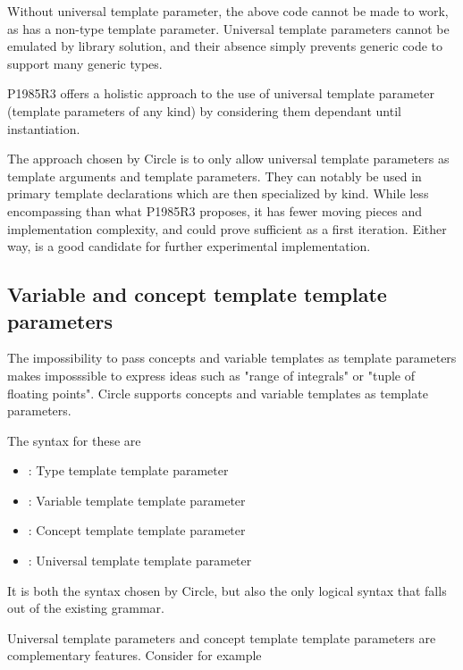 \documentclass{wg21}
\begin{document}
Without universal template parameter, the above code cannot be made to work,
as  has a non-type template parameter.
Universal template parameters cannot be emulated by library solution, and their absence simply prevents
generic code to support many generic types.

P1985R3 offers a holistic approach to the use of universal template parameter (template parameters of any kind)
by considering them dependant until instantiation.

The approach chosen by Circle is to only allow universal template parameters as template arguments and template parameters. They can notably be used in primary template declarations which are then specialized by kind.
While less encompassing than what P1985R3 proposes, it has fewer moving pieces and implementation complexity, and could
prove sufficient as a first iteration.
Either way,  is a good candidate for further experimental implementation.


\subsection{Variable and concept template template parameters}
\label{sec:vartemplate}

The impossibility to pass concepts and variable templates as template parameters makes imposssible to express ideas such as "range of integrals" or "tuple of floating points".
Circle supports concepts and variable templates as template parameters.

The syntax for these are
\begin{itemize}
    \item {} : Type template template parameter
    \item {} :  Variable template template parameter
    \item {} :  Concept  template template parameter
    \item {} :  Universal template template parameter
\end{itemize}

It is both the syntax chosen by Circle, but also the only logical syntax that falls out of the existing grammar.

Universal template parameters and concept template template parameters are complementary features.
Consider for example
\end{document}
